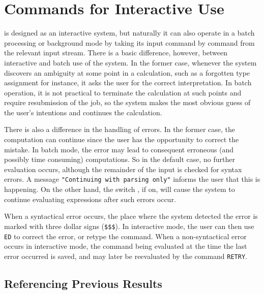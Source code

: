 \chapter{Commands for Interactive Use}
\label{interactive}

{\REDUCE} is designed as an interactive system, but naturally it can also
operate in a batch processing or background mode by taking its input
command by command from the relevant input stream. There is a basic
difference, however, between interactive and batch use of the system. In
the former case, whenever the system discovers an ambiguity at some point
in a calculation, such as a forgotten type assignment for instance, it asks
the user for the correct interpretation. In batch operation, it is not
practical to terminate the calculation at such points and require
resubmission of the job, so the system makes the most obvious guess of the
user's intentions and continues the calculation.

\hypertarget{switch:ERRCONT}{}
There is also a difference in the handling of errors.  In the former case,
the computation can continue since the user has the opportunity to correct
the mistake.  In batch mode, the error may lead to consequent erroneous
(and possibly time consuming) computations.  So in the default case, no
further evaluation occurs, although the remainder of the input is checked
for syntax errors.  A message \texttt{"Continuing with parsing only"}
informs the user that this is happening.  On the other hand, the switch
, if on, will cause the system to continue
evaluating expressions after such errors occur.

\hypertarget{command:RETRY}{}
When a syntactical error occurs, the place where the system detected the
error is marked with three dollar signs (\texttt{\$\$\$}). In interactive mode, the
user can then use \texttt{ED} to correct the error, or retype the
command.  When a non-syntactical error occurs in interactive mode, the
command being evaluated at the time the last error occurred is saved, and
may later be reevaluated by the command \texttt{RETRY}.

\section{Referencing Previous Results}

